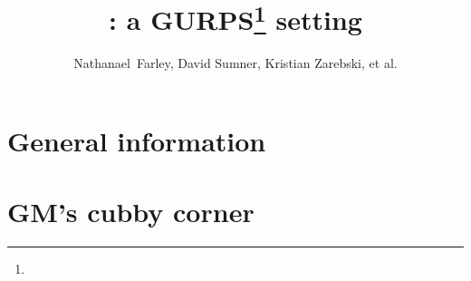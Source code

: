 


\title{: a GURPS\thanks{} setting}
\author{Nathanael~Farley, David Sumner, Kristian Zarebski, et al.}

\maketitle

\tableofcontents
\listoffigures

\part{General information}
\label{part:general-information}



\part{GM's cubby corner}
\label{part:gms-cubby-corner}






